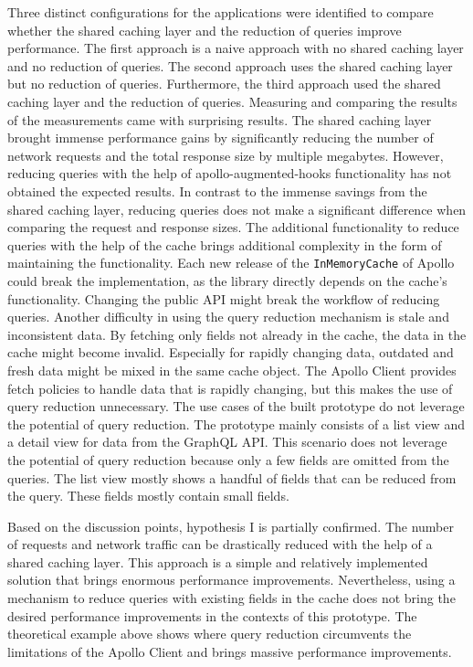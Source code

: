 \bigskip

\noindent Three distinct configurations for the applications were identified to compare whether the shared caching layer and the reduction of queries improve performance. The first approach is a naive approach with no shared caching layer and no reduction of queries. The second approach uses the shared caching layer but no reduction of queries. Furthermore, the third approach used the shared caching layer and the reduction of queries. Measuring and comparing the results of the measurements came with surprising results. The shared caching layer brought immense performance gains by significantly reducing the number of network requests and the total response size by multiple megabytes. However, reducing queries with the help of apollo-augmented-hooks functionality has not obtained the expected results. In contrast to the immense savings from the shared caching layer, reducing queries does not make a significant difference when comparing the request and response sizes. The additional functionality to reduce queries with the help of the cache brings additional complexity in the form of maintaining the functionality. Each new release of the \texttt{InMemoryCache} of Apollo could break the implementation, as the library directly depends on the cache's functionality. Changing the public \ac{API} might break the workflow of reducing queries. Another difficulty in using the query reduction mechanism is stale and inconsistent data. By fetching only fields not already in the cache, the data in the cache might become invalid. Especially for rapidly changing data, outdated and fresh data might be mixed in the same cache object. The Apollo Client provides fetch policies to handle data that is rapidly changing, but this makes the use of query reduction unnecessary. 
The use cases of the built prototype do not leverage the potential of query reduction. The prototype mainly consists of a list view and a detail view for data from the GraphQL \ac{API}. This scenario does not leverage the potential of query reduction because only a few fields are omitted from the queries. The list view mostly shows a handful of fields that can be reduced from the query. These fields mostly contain small fields.

\bigskip

\noindent Based on the discussion points, hypothesis I is partially confirmed. The number of requests and network traffic can be drastically reduced with the help of a shared caching layer. This approach is a simple and relatively implemented solution that brings enormous performance improvements. Nevertheless, using a mechanism to reduce queries with existing fields in the cache does not bring the desired performance improvements in the contexts of this prototype. The theoretical example above shows where query reduction circumvents the limitations of the Apollo Client and brings massive performance improvements.

